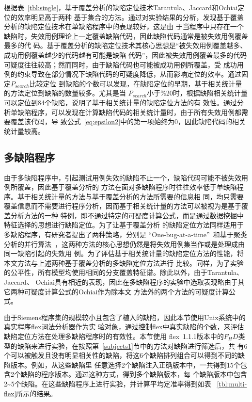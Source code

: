 根据表~\ref{tbl:single}，基于覆盖分析的缺陷定位技术Tarantula、Jaccard和Ochiai定位的效率明显高于两种
基于集合的方法。通过对实验结果的分析，发现基于覆盖分析的缺陷定位技术在单缺陷程序中的表现较好，这是由
于当程序中只存在一个缺陷时，失效用例理论上一定覆盖缺陷代码，因此缺陷代码通常是被失效用例覆盖最多的代
码。基于覆盖分析的缺陷定位技术其核心思想是``被失效用例覆盖越多、成功用例覆盖越少的代码越有可能是缺陷
代码''，因此被失效用例覆盖最多的代码可疑度往往较高；然而同时，由于缺陷代码也可能被成功用例所覆盖，受
成功用例的约束导致在部分情况下缺陷代码的可疑度降低，从而影响定位的效率。通过固定$P_{search}$比较定位
到缺陷的个数可以发现，在缺陷定位的早期，基于相关统计量的方法定位到缺陷的数量较多。尤其是当
$P_{search}$小于\%20时，根据缺陷相关统计量可以定位到84个缺陷，说明了基于相关统计量的缺陷定位方法的有
效性。通过分析单缺陷程序，可以发现在计算缺陷代码的相关统计量时，由于所有失效用例都需要覆盖该代码，导
致公式~\eqref{eq:epsilon2}中的第一项始终为0，因此缺陷代码的相关统计量较高。

\subsection{多缺陷程序}
由于多缺陷程序中，引起测试用例失效的缺陷不止一个，缺陷代码可能不被失效用例所覆盖，因此基于覆盖分析的
方法在面对多缺陷程序时往往效率低于单缺陷程序。基于相关统计量的方法与基于覆盖分析的方法所需要的信息相
同，均只需要覆盖信息而不需要进行程序分析，因而基于相关统计量的方法可以被视为是基于覆盖分析方法的一种
特例，即不通过特定的可疑度计算公式，而是通过数据挖掘中特征选择的思想进行缺陷定位。为了让基于覆盖分析
的缺陷定位方法同样适用于多缺陷程序，有研究者提出了两种策略，分别是
``One-bug-at-a-time''~\cite{klahr1988cognitive}和基于聚类分析的并行算法~\cite{jones2007debugging,
zheng2006statistical}，这两种方法的核心思想仍然是将失效用例集当作或是处理成由同一缺陷引起的失效用
例。为了评估基于相关统计量的缺陷定位方法的性能，将本文方法与上述两种基于覆盖分析的多缺陷定位方法进行
比较。同样，为了实验的公平性，所有模型均使用相同的分支覆盖特征谱。除此以外，由于Tarantula、Jaccard、
Ochiai具有相近的表现，因此在多缺陷程序的实验中选取表现略由于其它两种可疑度计算公式的Ochiai作为除本文
方法外的两个方法的可疑度计算公式。

由于Siemens程序集的规模较小且包含了植入的缺陷，因此本节使用Unix系统中的真实程序flex词法分析器作为实
验对象，通过控制flex中真实缺陷的个数，来评估缺陷定位方法在处理多缺陷程序时的有效性。本节使用
flex~1.1.1版本中的$F_HD$类型的缺陷来进行实验，在按照第~\ref{subjects1}节中的方法对缺陷进行筛选后，共
有6个可以被触发且没有明显相关性的缺陷，将这6个缺陷排列组合可以得到不同的缺陷版本。例如，从这些缺陷里
任意选择2个缺陷注入正确版本中，一共得到15个包含2个缺陷的程序版本。通过这种方式，得到多个缺陷版本，每
个缺陷版本中包含2\textasciitilde5个缺陷。在这些缺陷程序上进行实验，并计算平均定准率得到如表
~\ref{tbl:multi-flex}所示的结果。


